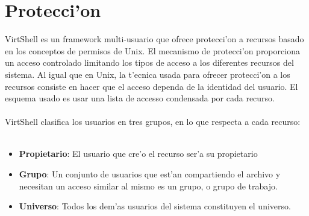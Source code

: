 \normalsize
\section{Protecci'on}

VirtShell es un framework multi-usuario que ofrece protecci'on a recursos basado en los conceptos de permisos de Unix. El mecanismo de protecci'on proporciona un acceso controlado limitando los tipos de acceso a los diferentes recursos del sistema. Al igual que en Unix, la t'ecnica usada para ofrecer protecci'on a los recursos consiste en hacer que el acceso dependa de la identidad del usuario. El esquema usado es usar una lista de accesso condensada por cada recurso.\\
\\
VirtShell clasifica los usuarios en tres grupos, en lo que respecta a cada recurso:\\
\\
\begin{itemize}
\item \textbf{Propietario}: El usuario que cre'o el recurso ser'a su propietario
\item \textbf{Grupo}: Un conjunto de usuarios que est'an compartiendo el archivo y necesitan un acceso similar al mismo es un grupo, o grupo de trabajo.
\item \textbf{Universo}: Todos los dem'as usuarios del sistema constituyen el universo.
\end{itemize}









